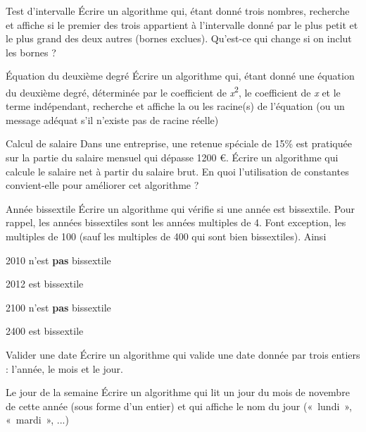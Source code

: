 \begin{Exercice}{Test d'intervalle}
{
Écrire un algorithme qui, étant donné trois nombres, recherche et
affiche si le premier des trois appartient à l’intervalle donné par le
plus petit et le plus grand des deux autres (bornes exclues). Qu’est-ce
qui change si on inclut les bornes ?}
\end{Exercice}

\begin{Exercice}{Équation du deuxième degré}
{
{Écrire un algorithme qui, étant donné une
équation du deuxième degré, déterminée par le coefficient de
}{\textit{x}}{\textsuperscript{2}}{,
le coefficient de
}{\textit{x}}{ et le
terme indépendant, recherche et affiche la ou les racine(s) de
l’équation (ou un message adéquat s'il
n'existe pas de racine réelle) }}
\end{Exercice}

\begin{Exercice}{Calcul de salaire}
{
Dans une entreprise, une retenue spéciale de 15\% est pratiquée sur la
partie du salaire mensuel qui dépasse 1200 €. Écrire un algorithme qui
calcule le salaire net à partir du salaire brut. En quoi l’utilisation
de constantes convient-elle pour améliorer cet algorithme ?}
\end{Exercice}

\begin{Exercice}{Année bissextile}
Écrire un algorithme qui vérifie si une année est bissextile. Pour
rappel, les années bissextiles sont les années multiples de 4. Font
exception, les multiples de 100 (sauf les multiples de 400 qui sont
bien bissextiles). Ainsi

\begin{liste}
\item {
2010 n'est \textbf{pas} bissextile}
\item {
2012 est bissextile}
\item {
2100 n'est \textbf{pas} bissextile}
\item {
2400 est bissextile}
\end{liste}

\end{Exercice}

\begin{Exercice}{Valider une date}
{
Écrire un algorithme qui valide une date donnée par trois entiers :
l’année, le mois et le jour.}
\end{Exercice}

\begin{Exercice}{Le jour de la semaine}
{
Écrire un algorithme qui lit un jour du mois de novembre de cette année
(sous forme d'un entier) et qui affiche le nom du jour
(«~lundi~», «~mardi~», ...)}
\end{Exercice}

